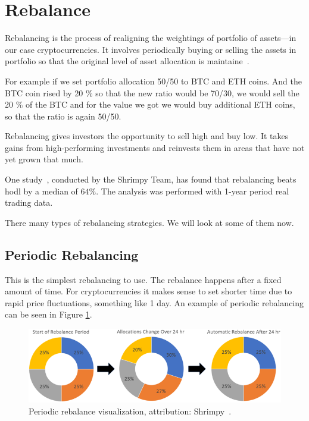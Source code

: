\section{Rebalance}
Rebalancing is the process of realigning the weightings of portfolio of assets---in our case cryptocurrencies. It involves periodically buying or selling the assets in portfolio so that the original level of asset allocation is maintaine~\cite{investopedia-rebalancing}.

For example if we set portfolio allocation 50/50 to BTC and ETH coins. And the BTC coin rised by 20 \% so that the new ratio would be 70/30, we would sell the 20 \% of the BTC and for the value we got we would buy additional ETH coins, so that the ratio is again 50/50.

Rebalancing gives investors the opportunity to sell high and buy low. It takes gains from high-performing investments and reinvests them in areas that have not yet grown that much.

One study~\cite{portfolio-rebalancing}, conducted by the Shrimpy Team, has found that rebalancing beats hodl by a median of $64\%$. The analysis was performed with 1-year period real trading data.

There many types of rebalancing strategies. We will look at some of them now.

\subsection*{Periodic Rebalancing}
This is the simplest rebalancing to use. The rebalance happens after a fixed amount of time. For cryptocurrencies it makes sense to set shorter time due to rapid price fluctuations, something like 1 day. An example of periodic rebalancing can be seen in Figure \ref{periodic-rebalance-figure}.

\begin{figure}[!hbt]
    \centering
    \includegraphics[width=\columnwidth]{figures/periodic-rebalance.png}
    \caption{Periodic rebalance visualization, attribution: Shrimpy~\cite{portfolio-rebalancing}.}
    \label{periodic-rebalance-figure}
\end{figure}

